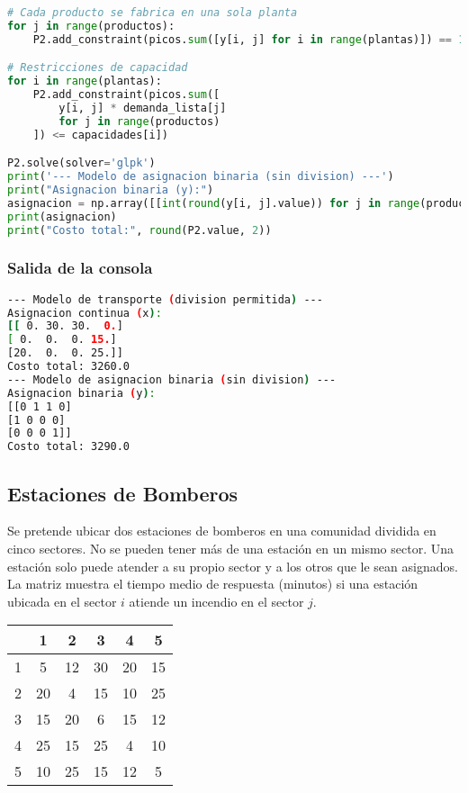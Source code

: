 \documentclass[12pt]{article}
\begin{document}
\begin{lstlisting}[language=Python]
# Cada producto se fabrica en una sola planta
for j in range(productos):
    P2.add_constraint(picos.sum([y[i, j] for i in range(plantas)]) == 1)

# Restricciones de capacidad
for i in range(plantas):
    P2.add_constraint(picos.sum([
        y[i, j] * demanda_lista[j]
        for j in range(productos)
    ]) <= capacidades[i])

P2.solve(solver='glpk')
print('--- Modelo de asignacion binaria (sin division) ---')
print("Asignacion binaria (y):")
asignacion = np.array([[int(round(y[i, j].value)) for j in range(productos)] for i in range(plantas)])
print(asignacion)
print("Costo total:", round(P2.value, 2))

\end{lstlisting}

\subsubsection{Salida de la consola}

\begin{lstlisting}[language=bash,backgroundcolor=\color{black},basicstyle=\color{white}\ttfamily,numbers=none]
--- Modelo de transporte (division permitida) ---
Asignacion continua (x):
[[ 0. 30. 30.  0.]
[ 0.  0.  0. 15.]
[20.  0.  0. 25.]]
Costo total: 3260.0
--- Modelo de asignacion binaria (sin division) ---
Asignacion binaria (y):
[[0 1 1 0]
[1 0 0 0]
[0 0 0 1]]
Costo total: 3290.0
\end{lstlisting}

\subsection{Estaciones de Bomberos}
Se pretende ubicar dos estaciones de bomberos en una comunidad dividida en cinco sectores. No se pueden tener más de una estación en un mismo sector. Una estación solo puede atender a su propio sector y a los otros que le sean asignados. La matriz muestra el tiempo medio de respuesta (minutos) si una estación ubicada en el sector $i$ atiende un incendio en el sector $j$.

\begin{table}[H]
    \centering
    \begin{tabular}{c|ccccc}
        \toprule
        & 1 & 2 & 3 & 4 & 5 \\
        \midrule
        1 & 5 & 12 & 30 & 20 & 15 \\
        2 & 20 & 4 & 15 & 10 & 25 \\
        3 & 15 & 20 & 6 & 15 & 12 \\
        4 & 25 & 15 & 25 & 4 & 10 \\
        5 & 10 & 25 & 15 & 12 & 5 \\
        \bottomrule
    \end{tabular}
\end{table}
\end{document}
